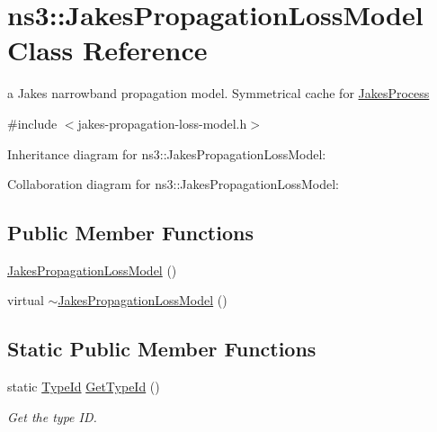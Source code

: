 \hypertarget{classns3_1_1JakesPropagationLossModel}{}\section{ns3\+:\+:Jakes\+Propagation\+Loss\+Model Class Reference}
\label{classns3_1_1JakesPropagationLossModel}


a Jakes narrowband propagation model. Symmetrical cache for \hyperlink{classns3_1_1JakesProcess}{Jakes\+Process}  




{\ttfamily \#include $<$jakes-\/propagation-\/loss-\/model.\+h$>$}



Inheritance diagram for ns3\+:\+:Jakes\+Propagation\+Loss\+Model\+:


Collaboration diagram for ns3\+:\+:Jakes\+Propagation\+Loss\+Model\+:
\subsection*{Public Member Functions}
\begin{DoxyCompactItemize}
\item 
\hyperlink{classns3_1_1JakesPropagationLossModel_a1c0b156b5777e4d0f45bce8f2c193915}{Jakes\+Propagation\+Loss\+Model} ()
\item 
virtual \hyperlink{classns3_1_1JakesPropagationLossModel_a7cafc78cda1086b621962388ed990773}{$\sim$\+Jakes\+Propagation\+Loss\+Model} ()
\end{DoxyCompactItemize}
\subsection*{Static Public Member Functions}
\begin{DoxyCompactItemize}
\item 
static \hyperlink{classns3_1_1TypeId}{Type\+Id} \hyperlink{classns3_1_1JakesPropagationLossModel_a3830f6b8a853b99d9cfd60f24d025dfe}{Get\+Type\+Id} ()
\begin{DoxyCompactList}\small\item\em Get the type ID. \end{DoxyCompactList}\end{DoxyCompactItemize}
